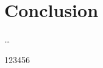 \documentclass[12pt]{article}
\numberwithin{equation}{section}
\begin{document}
\section{Conclusion}
\ldots

123456

\newpage
\begin{footnotesize} %
\singlespacing %

\setlength{\bibsep}{5pt} %
\thispagestyle{empty} %
\end{footnotesize} %
\end{document}
